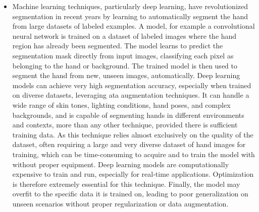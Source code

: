 \documentclass[12pt]{article}
\begin{document}
\begin{itemize}
  \item Machine learning techniques, particularly deep learning, have revolutionized segmentation in recent years by learning to automatically segment the hand from large datasets of labeled examples. A model, for example a convolutional neural network is trained on a dataset of labeled images where the hand region has already been segmented. The model learns to predict the segmentation mask directly from input images, classifying each pixel as belonging to the hand or background. The trained model is then used to segment the hand from new, unseen images, automatically. Deep learning models can achieve very high segmentation accuracy, especially when trained on diverse datasets, leveraging ata augmentation techniques. It can handle a wide range of skin tones, lighting conditions, hand poses, and complex backgrounds, and is capable of segmenting hands in different environments and contexts, more than any other technique, provided there is sufficient training data. As this technique relies almost exclusively on the quality of the dataset, often requiring a large and very diverse dataset of hand images for training, which can be time-consuming to acquire and to train the model with without proper equipment. Deep learning models are computationally expensive to train and run, especially for real-time applications. Optimization is therefore extremely essential for this technique. Finally, the model may overfit to the specific data it is trained on, leading to poor generalization on unseen scenarios without proper regularization or data augmentation.
\end{itemize}
\end{document}
